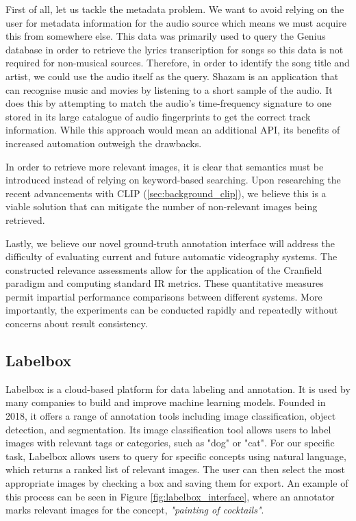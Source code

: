 \documentclass{l4proj}
\begin{document}
First of all, let us tackle the metadata problem. We want to avoid relying on the user for metadata information for the audio source which means we must acquire this from somewhere else. This data was primarily used to query the Genius database in order to retrieve the lyrics transcription for songs so this data is not required for non-musical sources. Therefore, in order to identify the song title and artist, we could use the audio itself as the query. Shazam \citep{wang2006shazam} is an application that can recognise music and movies by listening to a short sample of the audio. It does this by attempting to match the audio's time-frequency signature to one stored in its large catalogue of audio fingerprints to get the correct track information. While this approach would mean an additional API, its benefits of increased automation outweigh the drawbacks.

In order to retrieve more relevant images, it is clear that semantics must be introduced instead of relying on keyword-based searching. Upon researching the recent advancements with CLIP (\ref{sec:background_clip}), we believe this is a viable solution that can mitigate the number of non-relevant images being retrieved.

Lastly, we believe our novel ground-truth annotation interface will address the difficulty of evaluating current and future automatic videography systems. The constructed relevance assessments allow for the application of the Cranfield paradigm and computing standard IR metrics. These quantitative measures permit impartial performance comparisons between different systems. More importantly, the experiments can be conducted rapidly and repeatedly without concerns about result consistency.


\subsection{Labelbox}
\label{sec:labelbox}
Labelbox is a cloud-based platform for data labeling and annotation. It is used by many companies to build and improve machine learning models. Founded in 2018, it offers a range of annotation tools including image classification, object detection, and segmentation. Its image classification tool allows users to label images with relevant tags or categories, such as "dog" or "cat". For our specific task, Labelbox allows users to query for specific concepts using natural language, which returns a ranked list of relevant images. The user can then select the most appropriate images by checking a box and saving them for export. An example of this process can be seen in Figure \ref{fig:labelbox_interface}, where an annotator marks relevant images for the concept, \emph{"painting of cocktails"}.
\end{document}
